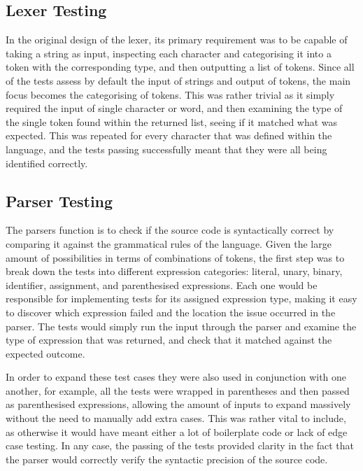 \documentclass[
]{report}
\begin{document}
\subsection{Lexer Testing}
In the original design of the lexer, its primary requirement was to be
capable of taking a string as input, inspecting each character and
categorising it into a \gls{token} with the corresponding type, and then
outputting a list of \glspl{token}. Since all of the tests assess by default
the input of strings and output of \glspl{token}, the main focus becomes the
categorising of \glspl{token}. This was rather trivial as it simply required
the input of single character or word, and then examining the type of
the single \gls{token} found within the returned list, seeing if it matched
what was expected. This was repeated for every character that was
defined within the language, and the tests passing successfully meant
that they were all being identified correctly.

\subsection{Parser Testing}
The parsers function is to check if the source code is syntactically
correct by comparing it against the grammatical rules of the language.
Given the large amount of possibilities in terms of combinations of
\glspl{token}, the first step was to break down the tests into different
\gls{expression} categories: literal, unary, binary, \gls{identifier}, assignment,
and parenthesised \glspl{expression}. Each one would be responsible for
implementing tests for its assigned \gls{expression} type, making it easy to
discover which \gls{expression} failed and the location the issue occurred in
the parser. The tests would simply run the input through the parser and
examine the type of \gls{expression} that was returned, and check that it
matched against the expected outcome.

In order to expand these test cases they were also used in conjunction
with one another, for example, all the tests were wrapped in parentheses
and then passed as parenthesised \glspl{expression}, allowing the amount of
inputs to expand massively without the need to manually add extra cases.
This was rather vital to include, as otherwise it would have meant
either a lot of boilerplate code or lack of edge case testing. In any
case, the passing of the tests provided clarity in the fact that the
parser would correctly verify the syntactic precision of the source
code.
\end{document}
